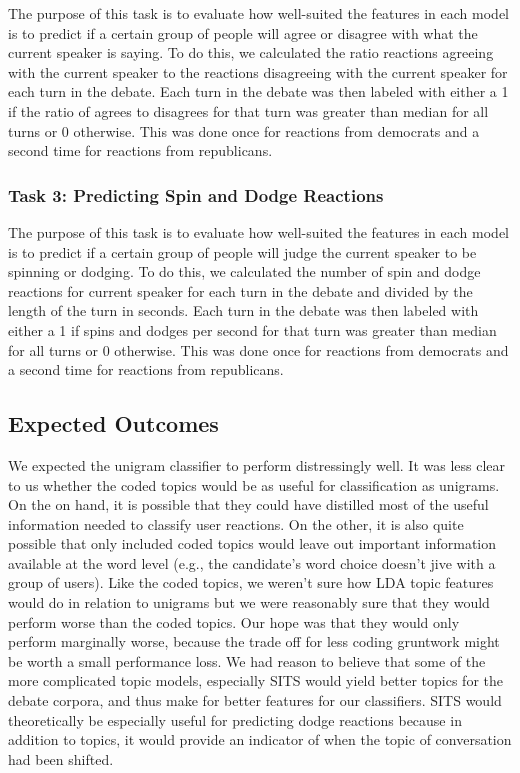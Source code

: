The purpose of this task is to evaluate how well-suited the features in each model is to predict if a certain group of people will agree or disagree with what the current speaker is saying.
To do this, we calculated the ratio reactions agreeing with the current speaker to the reactions disagreeing with the current speaker for each turn in the debate.
Each turn in the debate was then labeled with either a 1 if the ratio of agrees to disagrees for that turn was greater than median for all turns or 0 otherwise.
This was done once for reactions from democrats and a second time for reactions from republicans.

\subsubsection{Task 3: Predicting Spin and Dodge Reactions}

The purpose of this task is to evaluate how well-suited the features in each model is to predict if a certain group of people will judge the current speaker to be spinning or dodging.
To do this, we calculated the number of spin and dodge reactions for current speaker for each turn in the debate and divided by the length of the turn in seconds.
Each turn in the debate was then labeled with either a 1 if spins and dodges per second for that turn was greater than median for all turns or 0 otherwise.
This was done once for reactions from democrats and a second time for reactions from republicans.


\subsection{Expected Outcomes}

We expected the unigram classifier to perform distressingly well.
It was less clear to us whether the coded topics would be as useful for classification as unigrams.
On the on hand, it is possible that they could have distilled most of the useful information needed to classify user reactions.
On the other, it is also quite possible that only included coded topics would leave out important information available at the word level (e.g., the candidate's word choice doesn't jive with a group of users).
Like the coded topics, we weren't sure how LDA topic features would do in relation to unigrams but we were reasonably sure that they would perform worse than the coded topics.
Our hope was that they would only perform marginally worse, because the trade off for less coding gruntwork might be worth a small performance loss.
We had reason to believe that some of the more complicated topic models, especially SITS would yield better topics for the debate corpora, and thus make for better features for our classifiers.
SITS would theoretically be especially useful for predicting dodge reactions because in addition to topics, it would provide an indicator of when the topic of conversation had been shifted.
